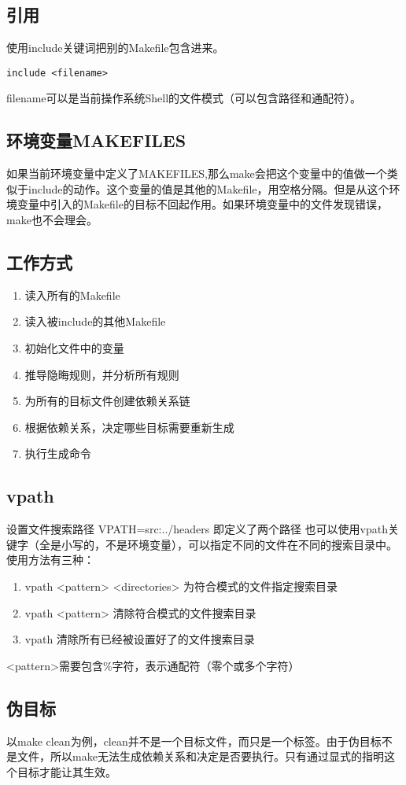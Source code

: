 \documentclass{article}
\begin{document}
\subsection{引用}
使用include关键词把别的Makefile包含进来。
\begin{verbatim}
include <filename>
\end{verbatim}
filename可以是当前操作系统Shell的文件模式（可以包含路径和通配符）。
\subsection{环境变量MAKEFILES}
如果当前环境变量中定义了MAKEFILES,那么make会把这个变量中的值做一个类似于include的动作。这个变量的值是其他的Makefile，用空格分隔。但是从这个环境变量中引入的Makefile的目标不回起作用。如果环境变量中的文件发现错误，make也不会理会。
\subsection{工作方式}
\begin{enumerate}
\item  读入所有的Makefile
\item  读入被include的其他Makefile
\item  初始化文件中的变量
\item  推导隐晦规则，并分析所有规则
\item  为所有的目标文件创建依赖关系链
\item  根据依赖关系，决定哪些目标需要重新生成
\item  执行生成命令
\end{enumerate}
\subsection{vpath}
设置文件搜索路径
VPATH=src:../headers
即定义了两个路径
也可以使用vpath关键字（全是小写的，不是环境变量），可以指定不同的文件在不同的搜索目录中。使用方法有三种：
\begin{enumerate}
\item  vpath <pattern> <directories>
为符合模式的文件指定搜索目录
\item  vpath <pattern>
清除符合模式的文件搜索目录
\item  vpath
清除所有已经被设置好了的文件搜索目录
\end{enumerate}
<pattern>需要包含\%字符，表示通配符（零个或多个字符）
\subsection{伪目标}
以make clean为例，clean并不是一个目标文件，而只是一个标签。由于伪目标不是文件，所以make无法生成依赖关系和决定是否要执行。只有通过显式的指明这个目标才能让其生效。
\end{document}
